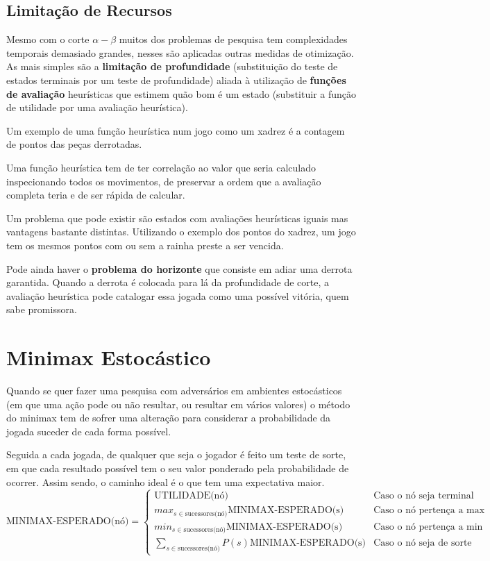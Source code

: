 \documentclass[]{report}
\begin{document}
\subsection{Limitação de Recursos}
Mesmo com o corte $\alpha-\beta$ muitos dos problemas de pesquisa tem complexidades temporais demasiado grandes, nesses são aplicadas outras medidas de otimização. As mais simples são a \textbf{limitação de profundidade} (substituição do teste de estados terminais por um teste de profundidade) aliada à utilização de \textbf{funções de avaliação} heurísticas que estimem quão bom é um estado (substituir a função de utilidade por uma avaliação heurística).\par
Um exemplo de uma função heurística num jogo como um xadrez é a contagem de pontos das peças derrotadas.\par
Uma função heurística tem de ter correlação ao valor que seria calculado inspecionando todos os movimentos, de preservar a ordem que a avaliação completa teria e de ser rápida de calcular.\par
Um problema que pode existir são estados com avaliações heurísticas iguais mas vantagens bastante distintas. Utilizando o exemplo dos pontos do xadrez, um jogo tem os mesmos pontos com ou sem a rainha preste a ser vencida.\par
Pode ainda haver o \textbf{problema do horizonte} que consiste em adiar uma derrota garantida. Quando a derrota é colocada para lá da profundidade de corte, a avaliação heurística pode catalogar essa jogada como uma possível vitória, quem sabe promissora.
\clearpage
\section{Minimax Estocástico}
Quando se quer fazer uma pesquisa com adversários em ambientes estocásticos (em que uma ação pode ou não resultar, ou resultar em vários valores) o método do minimax tem de sofrer uma alteração para considerar a probabilidade da jogada suceder de cada forma possível.\par
Seguida a cada jogada, de qualquer que seja o jogador é feito um teste de sorte, em que cada resultado possível tem o seu valor ponderado pela probabilidade de ocorrer. Assim sendo, o caminho ideal é o que tem uma expectativa maior.
$$\text{MINIMAX-ESPERADO(nó)} =
\begin{cases}
	\text{UTILIDADE(nó)} & \text{Caso o nó seja terminal}\\
	max_{s \in \text{sucessores(nó)}} \text{MINIMAX-ESPERADO(s)}& \text{Caso o nó pertença a max}\\
	min_{s \in \text{sucessores(nó)}} \text{MINIMAX-ESPERADO(s)}& \text{Caso o nó pertença a min}\\
	\sum_{s \in \text{sucessores(nó)}} P(s)\text{MINIMAX-ESPERADO(s)}& \text{Caso o nó seja de sorte}
\end{cases}$$
\end{document}
